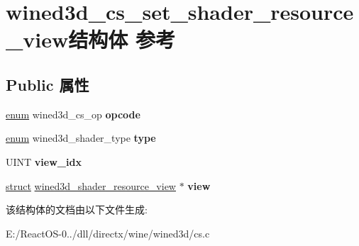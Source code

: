 \hypertarget{structwined3d__cs__set__shader__resource__view}{}\section{wined3d\+\_\+cs\+\_\+set\+\_\+shader\+\_\+resource\+\_\+view结构体 参考}
\label{structwined3d__cs__set__shader__resource__view}
\subsection*{Public 属性}
\begin{DoxyCompactItemize}
\item 
\mbox{\label{structwined3d__cs__set__shader__resource__view_a11a971d09bd3d1714f071f9b96a7fa2a}} 
\hyperlink{interfaceenum}{enum} wined3d\+\_\+cs\+\_\+op {\bfseries opcode}
\item 
\mbox{\label{structwined3d__cs__set__shader__resource__view_adf05fee8f3f8144b673afcf3c66a2166}} 
\hyperlink{interfaceenum}{enum} wined3d\+\_\+shader\+\_\+type {\bfseries type}
\item 
\mbox{\label{structwined3d__cs__set__shader__resource__view_acf278cca27f059ca8feed99debe1349a}} 
U\+I\+NT {\bfseries view\+\_\+idx}
\item 
\mbox{\label{structwined3d__cs__set__shader__resource__view_acfa650bb06182140775e680537a55bb4}} 
\hyperlink{interfacestruct}{struct} \hyperlink{structwined3d__shader__resource__view}{wined3d\+\_\+shader\+\_\+resource\+\_\+view} $\ast$ {\bfseries view}
\end{DoxyCompactItemize}


该结构体的文档由以下文件生成\+:\begin{DoxyCompactItemize}
\item 
E\+:/\+React\+O\+S-\/0../dll/directx/wine/wined3d/cs.\+c\end{DoxyCompactItemize}
